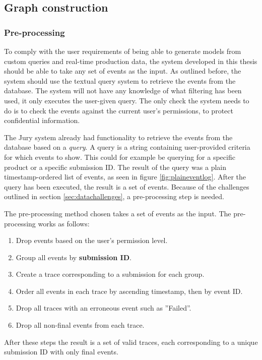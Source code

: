 \subsection{Graph construction}

\subsubsection{Pre-processing}

To comply with the user requirements of being able to generate models from custom queries and real-time production data, the system developed in this thesis should be able to take any set of events as the input.
As outlined before, the system should use the textual query system to retrieve the events from the database.
The system will not have any knowledge of what filtering has been used, it only executes the user-given query.
The only check the system needs to do is to check the events against the current user's permissions, to protect confidential information.

The Jury system already had functionality to retrieve the events from the database based on a \emph{query}.
A query is a string containing user-provided criteria for which events to show.
This could for example be querying for a specific product or a specific submission ID. 
The result of the query was a plain timestamp-ordered list of events, as seen in figure \ref{fig:plaineventlog}.
After the query has been executed, the result is a set of events.
Because of the challenges outlined in section \ref{sec:datachallenges}, a pre-processing step is needed.

The pre-processing method chosen takes a set of events as the input. The pre-processing works as follows:
\begin{enumerate}
    \item Drop events based on the user's permission level.
    \item Group all events by \textbf{submission ID}.
    \item Create a trace corresponding to a submission for each group.
    \item Order all events in each trace by ascending timestamp, then by event ID.
    \item Drop all traces with an erroneous event such as ''Failed''.
    \item Drop all non-final events from each trace.
\end{enumerate}
After these steps the result is a set of valid traces, each corresponding to a unique submission ID with only final events.

